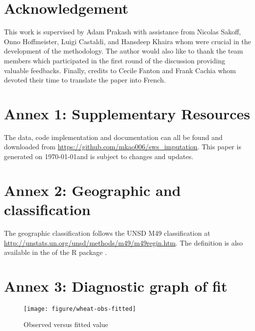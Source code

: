 \documentclass[nojss]{jss}\usepackage[]{graphicx}\usepackage[]{color}
\makeatletter
\def\maxwidth{ %
  \ifdim\Gin@nat@width>\linewidth
    \linewidth
  \else
    \Gin@nat@width
  \fi
}
\newenvironment{knitrout}{}{} %
\makeatother
\begin{document}
\section*{Acknowledgement}
This work is supervised by Adam Prakash with assistance from Nicolas
Sakoff, Onno Hoffmeister, Luigi Castaldi, and Hansdeep Khaira whom
were crucial in the development of the methodology. The author would
also like to thank the team members which participated in the first
round of the discussion providing valuable feedbacks. Finally, credits
to Cecile Fanton and Frank Cachia whom devoted their time to translate
the paper into French.

\section*{Annex 1: Supplementary Resources}

The data, code implementation and documentation can all be found and
downloaded from \url{https://github.com/mkao006/sws_imputation}. This
paper is generated on \today and is subject to changes and updates.


\section*{Annex 2: Geographic and classification}

The geographic classification follows the UNSD M49 classification at
\url{http://unstats.un.org/unsd/methods/m49/m49regin.htm}. The
definition is also available in the  of the R
package .



\section*{Annex 3: Diagnostic graph of fit}

\begin{knitrout}
\color{fgcolor}\begin{figure}[!ht]


{\centering \texttt{[image: figure/wheat-obs-fitted]} 

}

\caption[Observed versus fitted value]{Observed versus fitted value\label{fig:wheat-obs-fitted}}
\end{figure}


\end{knitrout}
\end{document}
